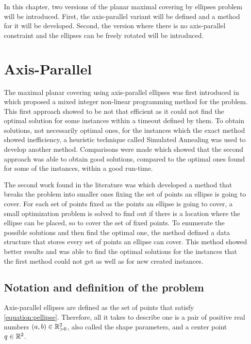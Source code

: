 In this chapter, two versions of the planar maximal covering by ellipses problem will be introduced.
First, the axis-parallel variant will be defined and a method for it will be developed. Second, the version where there is no axis-parallel constraint and the ellipses can be freely rotated will be introduced.

\section{Axis-Parallel}
The maximal planar covering using axis-parallel ellipses was first introduced in \cite{canbolat} which proposed a mixed integer non-linear programming method for the problem. This first approach showed to be not that efficient as it could not find the optimal solution for some instances within a timeout defined by them. To obtain solutions, not necessarily optimal ones, for the instances which the exact method showed inefficiency, a heuristic technique called Simulated Annealing was used to develop another method. Comparisons were made which showed that the second approach was able to obtain good solutions, compared to the optimal ones found for some of the instances, within a good run-time.

The second work found in the literature was \cite{andreta} which developed a method that breaks the problem into smaller ones fixing the set of points an ellipse is going to cover. For each set of points fixed as the points an ellipse is going to cover, a small optimization problem is solved to find out if there is a location where the ellipse can be placed, so to cover the set of fixed points. To enumerate the possible solutions and then find the optimal one, the method defined a data structure that stores every set of points an ellipse can cover. This method showed better results and was able to find the optimal solutions for the instances that the first method could not get as well as for new created instances.

\subsection{Notation and definition of the problem}

Axis-parallel ellipses are defined as the set of points that satisfy \autoref{equation:pellipse}. Therefore, all it takes to describe one is a pair of positive real numbers $(a,b) \in \mathbb{R}_{>0}^2$, also called the shape parameters, and a center point $q \in \mathbb{R}^2$. 

